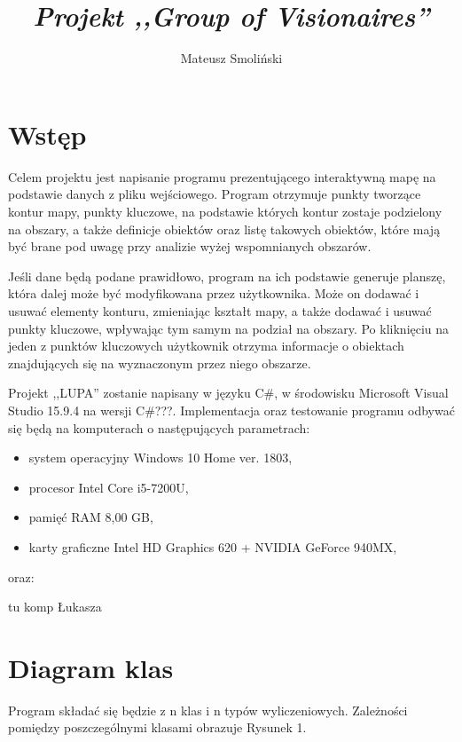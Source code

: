 \documentclass[a4paper,11pt]{article}
\title{ \sc{Specyfikacja implementacyjna} \\
\emph{Projekt ,,Group of Visionaires''} }
\author{Mateusz Smoliński}
\newcommand\tab[1][0.6cm]{\hspace*{#1}}
\begin{document}
\maketitle

\thispagestyle{empty}

\tableofcontents

\newpage

\section{Wstęp}

\tab Celem projektu jest napisanie programu prezentującego interaktywną mapę na podstawie danych z pliku wejściowego. Program otrzymuje punkty tworzące kontur mapy, punkty kluczowe, na podstawie których kontur zostaje podzielony na obszary, a także definicje obiektów oraz listę takowych obiektów, które mają być brane pod uwagę przy analizie wyżej wspomnianych obszarów.

Jeśli dane będą podane prawidłowo, program na ich podstawie generuje planszę, która dalej może być modyfikowana przez użytkownika. Może on dodawać i usuwać elementy konturu, zmieniając kształt mapy, a także dodawać i usuwać punkty kluczowe, wpływając tym samym na podział na obszary. Po kliknięciu na jeden z punktów kluczowych użytkownik otrzyma informacje o obiektach znajdujących się na wyznaczonym przez niego obszarze.

Projekt ,,LUPA'' zostanie napisany w języku C\#, w środowisku Microsoft Visual Studio 15.9.4 na wersji C\#???. Implementacja oraz testowanie programu odbywać się będą na komputerach o następujących parametrach: 
\begin{itemize}

\item system operacyjny Windows 10 Home ver. 1803,
\item procesor Intel Core i5-7200U,
\item pamięć RAM 8,00 GB,
\item karty graficzne Intel HD Graphics 620 + NVIDIA GeForce 940MX,

\end{itemize}

oraz:

tu komp Łukasza


\section{Diagram klas}

\tab Program składać się będzie z n klas i n typów wyliczeniowych. Zależności pomiędzy poszczególnymi klasami obrazuje Rysunek 1.
\end{document}
